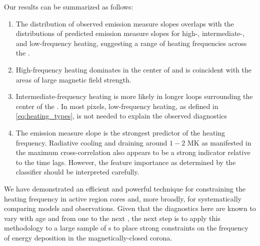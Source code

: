 Our results can be summarized as follows:
\begin{enumerate}
    \item The distribution of observed emission measure slopes overlaps with the distributions of predicted emission measure slopes for high-, intermediate-, and low-frequency heating, suggesting a range of heating frequencies across the \AR{}.
    \item High-frequency heating dominates in the center of \AR{} and is coincident with the areas of large magnetic field strength.
    \item Intermediate-frequency heating is more likely in longer loops surrounding the center of the \AR{}. In most pixels, low-frequency heating, as defined in \autoref{eq:heating_types}, is not needed to explain the observed diagnostics
    \item The emission measure slope is the strongest predictor of the heating frequency. Radiative cooling and draining around $1-2$ MK as manifested in the maximum cross-correlation also appears to be a strong indicator relative to the time lags. However, the feature importance as determined by the classifier should be interpreted carefully.
\end{enumerate}

We have demonstrated an efficient and powerful technique for constraining the heating frequency in active region cores and, more broadly, for systematically comparing models and observations. Given that the diagnostics here are known to vary with age \citep[e.g.][]{schmelz_cold_2012,del_zanna_evolution_2015} and from one \AR{} to the next \citep{warren_systematic_2012,viall_survey_2017}, the next step is to apply this methodology to a large sample of \AR s to place strong constraints on the frequency of energy deposition in the magnetically-closed corona.
